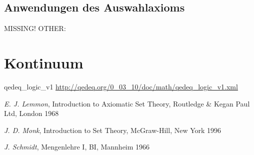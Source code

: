 \documentclass[a4paper,german,10pt,twoside]{book}
\theoremstyle{definition}
\theoremstyle{remark}
\begin{document}
\section{Anwendungen des Auswahlaxioms} \label{chapter6_section1} \hypertarget{chapter6_section1}{}
MISSING! OTHER: 



\chapter{Kontinuum} \label{chapter7} \hypertarget{chapter7}{}




\begin{thebibliography}{99}


 qedeq\_logic\_v1 \url{http://qedeq.org/0_03_10/doc/math/qedeq_logic_v1.xml}



 \emph{E. J. Lemmon}, Introduction to Axiomatic Set Theory, Routledge \& Kegan Paul Ltd, London 1968

 \emph{J. D. Monk}, Introduction to Set Theory, McGraw-Hill, New York 1996

 \emph{J. Schmidt}, Mengenlehre I, BI, Mannheim 1966

\end{thebibliography}
\backmatter

 \printindex
\end{document}
